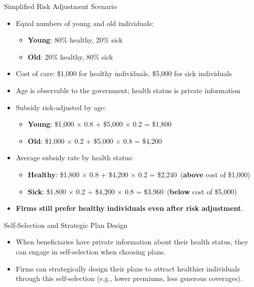 \documentclass[professionalfonts, aspectratio=169]{beamer}
\begin{document}
\begin{frame}{Simplified Risk Adjustment Scenario}
  \begin{itemize}
    \item Equal numbers of young and old individuals:
    \begin{itemize}
      \item \textbf{Young}: 80\% healthy, 20\% sick
      \item \textbf{Old}: 20\% healthy, 80\% sick
    \end{itemize}
    \item Cost of care: \$1,000 for healthy individuals, \$5,000 for sick individuals
    \item Age is observable to the government; health status is private information \pause
    \item Subsidy risk-adjusted by age:
    \begin{itemize}
      \item \textbf{Young}: \$1,000 $\times$ 0.8 + \$5,000 $\times$ 0.2 = \$1,800
      \item \textbf{Old}: \$1,000 $\times$ 0.2 + \$5,000 $\times$ 0.8 = \$4,200
    \end{itemize}
    \item Average subsidy rate by health status:
    \begin{itemize}
      \item \textbf{Healthy}: \$1,800 $\times$ 0.8 + \$4,200 $\times$ 0.2 = \$2,240\ (\textbf{above} cost of \$1,000)
      \item \textbf{Sick}: \$1,800 $\times$ 0.2 + \$4,200 $\times$ 0.8 = \$3,960\ (\textbf{below} cost of \$5,000)
    \end{itemize}
    \item \textbf{Firms still prefer healthy individuals even after risk adjustment}.
  \end{itemize}
\end{frame}

\begin{frame}{Self-Selection and Strategic Plan Design}
  \begin{itemize}
    \item When beneficiaries have private information about their health status, they can engage in self-selection when choosing plans.
    \item Firms can strategically design their plans to attract healthier individuals through this self-selection (e.g., lower premiums, less generous coverages).
  \end{itemize}
\end{frame}
\end{document}
